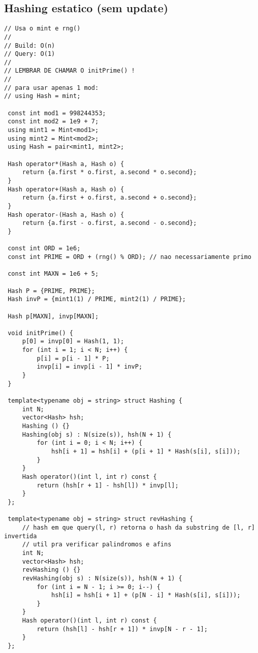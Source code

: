 \documentclass[11pt, a4paper, twoside]{article}
\begin{document}
\subsection{Hashing estatico (sem update)}
\begin{lstlisting}
// Usa o mint e rng()
//
// Build: O(n)
// Query: O(1)
//
// LEMBRAR DE CHAMAR O initPrime() !
//
// para usar apenas 1 mod:
// using Hash = mint;

 const int mod1 = 998244353;
 const int mod2 = 1e9 + 7;
 using mint1 = Mint<mod1>;
 using mint2 = Mint<mod2>;
 using Hash = pair<mint1, mint2>;
 
 Hash operator*(Hash a, Hash o) {
     return {a.first * o.first, a.second * o.second};
 }
 Hash operator+(Hash a, Hash o) {
     return {a.first + o.first, a.second + o.second};
 }
 Hash operator-(Hash a, Hash o) {
     return {a.first - o.first, a.second - o.second};
 }
 
 const int ORD = 1e6;
 const int PRIME = ORD + (rng() % ORD); // nao necessariamente primo
 
 const int MAXN = 1e6 + 5;
 
 Hash P = {PRIME, PRIME};
 Hash invP = {mint1(1) / PRIME, mint2(1) / PRIME};
 
 Hash p[MAXN], invp[MAXN];
 
 void initPrime() {
     p[0] = invp[0] = Hash(1, 1);
     for (int i = 1; i < N; i++) {
         p[i] = p[i - 1] * P;
         invp[i] = invp[i - 1] * invP;
     }
 }
 
 template<typename obj = string> struct Hashing {
     int N;
     vector<Hash> hsh;
     Hashing () {}
     Hashing(obj s) : N(size(s)), hsh(N + 1) {
         for (int i = 0; i < N; i++) {
             hsh[i + 1] = hsh[i] + (p[i + 1] * Hash(s[i], s[i]));
         }
     }
     Hash operator()(int l, int r) const {
         return (hsh[r + 1] - hsh[l]) * invp[l];
     }
 };
 
 template<typename obj = string> struct revHashing {
     // hash em que query(l, r) retorna o hash da substring de [l, r] invertida
     // util pra verificar palindromos e afins
     int N;
     vector<Hash> hsh;
     revHashing () {}
     revHashing(obj s) : N(size(s)), hsh(N + 1) {
         for (int i = N - 1; i >= 0; i--) {
             hsh[i] = hsh[i + 1] + (p[N - i] * Hash(s[i], s[i]));
         }
     }
     Hash operator()(int l, int r) const {
         return (hsh[l] - hsh[r + 1]) * invp[N - r - 1];
     }
 };
\end{lstlisting}
\end{document}
